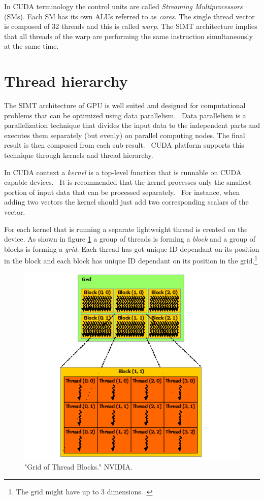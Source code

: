 \documentclass[12pt,oneside]{fithesis2}
\begin{document}
In CUDA terminology the control units are called \emph{Streaming Multiprocessors} (SMs). Each SM has its own ALUs referred to as \emph{cores}. The single thread vector is composed of 32 threads and this is called \emph{warp}. The SIMT architecture implies that all threads of the warp are performing the same instruction simultaneously at the same time.~\cite{cuda_guide}


\section{Thread hierarchy}

The SIMT architecture of GPU is well suited and designed for computational problems that can be optimized using data parallelism.~\cite{professional_cuda} Data parallelism is a parallelization technique that divides the input data to the independent parts and executes them separately (but evenly) on parallel computing nodes. The final result is then composed from each sub-result.~\cite{data_parallel_algorithms} CUDA platform supports this technique through kernels and thread hierarchy.

In CUDA context a \emph{kernel} is a top-level function that is runnable on CUDA capable devices.~\cite{cuda_guide} It is recommended that the kernel processes only the smallest portion of input data that can be processed separately.~\cite{data_parallel_algorithms} For instance, when adding two vectors the kernel should just add two corresponding scalars of the vector.

For each kernel that is running a separate lightweight thread is created on the device. As shown in figure \ref{fig:grid} a group of threads is forming a \emph{block} and a group of blocks is forming a \emph{grid}. Each thread has got unique ID dependant on its position in the block and each block has unique ID dependant on its position in the grid.\footnote{The grid might have up to 3 dimensions.~\cite{cuda_guide}}

\begin{figure}[H]
	\centering
	\includegraphics[scale=0.9]{figures/grid-of-thread-blocks.png}
	\caption{"Grid of Thread Blocks." NVIDIA. \cite{cuda_guide}}
	\label{fig:grid}
\end{figure}
\end{document}
